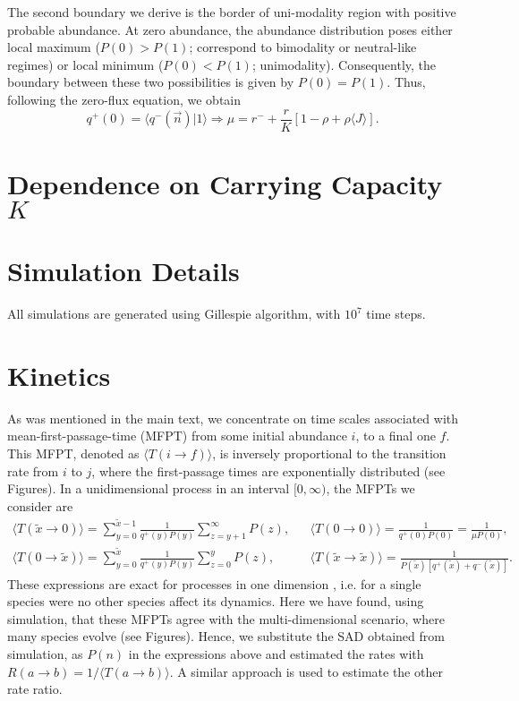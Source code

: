 \documentclass[9pt,twoside,lineno]{pnas-new}
\begin{document}
The second boundary we derive is the border of uni-modality region with positive probable abundance. At zero abundance, the abundance distribution poses either local maximum ($P(0)>P(1)$; correspond to bimodality or neutral-like regimes) or local minimum ($P(0)<P(1)$; unimodality). Consequently, the boundary between these two possibilities is given by $P(0)=P(1)$.  Thus, following the zero-flux equation, we obtain
\begin{equation}
    q^+(0) = \langle q^-(\vec{n})|1\rangle  \Longrightarrow  \mu = r^- +\frac{r}{K} \left[1-\rho + \rho \langle J\rangle\right]. 
\end{equation}
 





\section*{Dependence on Carrying Capacity $K$}



\section*{Simulation Details}
All simulations are generated using Gillespie algorithm, with $10^7$ time steps. 


\section*{Kinetics}

As was mentioned in the main text, we concentrate on time scales associated with mean-first-passage-time (MFPT) from some initial abundance $i$, to a final one $f$. This MFPT, denoted as $\langle T(i\rightarrow f)\rangle$, is inversely proportional to the transition rate from $i$ to $j$, where the first-passage times are exponentially distributed (see Figures). 
In a unidimensional process in an interval $[0,\infty)$, the MFPTs we consider are  
\begin{eqnarray}
      \langle T (\tilde{x} \rightarrow 0) \rangle =   \sum_{y=0}^{\tilde{x}-1}\frac{1}{q^+(y)P(y)}\sum_{z=y+1}^{\infty}{P(z)}, & &
  \langle T (0 \rightarrow 0) \rangle =  \frac{1}{q^+(0)P(0)}=  \frac{1}{\mu P(0)}, \\ \nonumber 
  \langle T (0 \rightarrow \tilde{x}) \rangle =  \sum_{y=0}^{\tilde{x}}\frac{1}{q^+(y)P(y)}\sum_{z=0}^{y}{P(z)}, & &
  \langle T (\tilde{x} \rightarrow \tilde{x}) \rangle =    \frac{1}{P(\tilde{x})[q^+(\tilde{x})+q^-(\tilde{x})]} .
\end{eqnarray}
These expressions are exact for processes in one dimension \cite{gardiner1985handbook}, i.e. for a single species were no other species affect its dynamics.  Here we have found, using simulation, that these MFPTs agree with the multi-dimensional scenario, where many species evolve (see Figures). Hence, we substitute the SAD obtained from simulation,  as $P(n)$ in the expressions above and estimated the rates with $ R(a \rightarrow b)=1/\langle T(a \rightarrow b)\rangle $. A similar approach is used to estimate the other rate ratio. 
\end{document}
